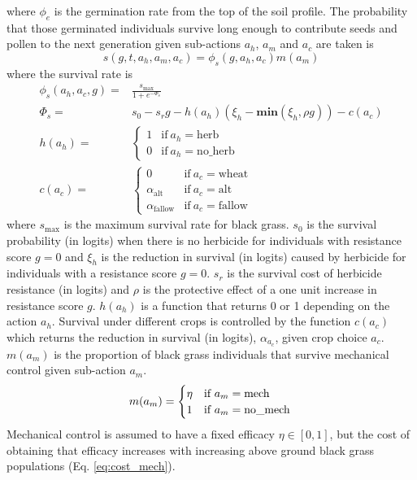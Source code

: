\documentclass[12pt, a4paper]{article}
\begin{document}
where $\phi_e$ is the germination rate from the top of the soil profile. The probability that those germinated individuals survive long enough to contribute seeds and pollen to the next generation given sub-actions $a_h$, $a_m$ and $a_c$ are taken is 
\begin{equation}
\label{eq:survival}
	s(g, t, a_h, a_m, a_c) = \phi_s(g, a_h, a_c)m(a_m) 
\end{equation}   
where the survival rate is 
\begin{align}\label{eq:sur_dens_ind}
	\phi_s(a_h, a_c, g) =& \frac{s_\text{max}}{1 + e^{-\Phi_s}}\\
	\Phi_s =& s_0 - s_rg - h(a_h)\left(\xi_h - \textbf{min}(\xi_h, \rho g) \right) - c(a_c)\\
	h(a_h) =& \begin{cases}
		1 &\text{if}~a_h = \text{herb}\\
		0 &\text{if}~a_h = \text{no\_herb}
	\end{cases}\\
	c(a_c) =& \begin{cases}
		0 &\text{if}~a_c = \text{wheat}\\
		\alpha_\text{alt} &\text{if}~a_c = \text{alt}\\
		\alpha_\text{fallow} &\text{if}~a_c = \text{fallow}
	\end{cases} 
\end{align}
where $s_\text{max}$ is the maximum survival rate for black grass. $s_0$ is the survival probability (in logits) when there is no herbicide for individuals with resistance score $g = 0$ and $\xi_h$ is the reduction in survival (in logits) caused by herbicide for individuals with a resistance score $g = 0$. $s_r$ is the survival cost of herbicide resistance (in logits) and $\rho$ is the protective effect of a one unit increase in resistance score $g$. $h(a_h)$ is a function that returns 0 or 1 depending on the action $a_h$. Survival under different crops is controlled by the function $c(a_c)$ which returns the reduction in survival (in logits), $\alpha_{a_c}$, given crop choice $a_c$. $m(a_m)$ is the proportion of black grass individuals that survive mechanical control given sub-action $a_m$.
\begin{equation}
	m(a_m) = \begin{cases}
		\eta &\text{if}~a_m = \text{mech}\\
		1 &\text{if}~a_m = \text{no\_mech}
	\end{cases}\\
\end{equation}
Mechanical control is assumed to have a fixed efficacy $\eta \in [0, 1]$, but the cost of obtaining that efficacy increases with increasing above ground black grass populations (Eq. \ref{eq:cost_mech}).
\end{document}
